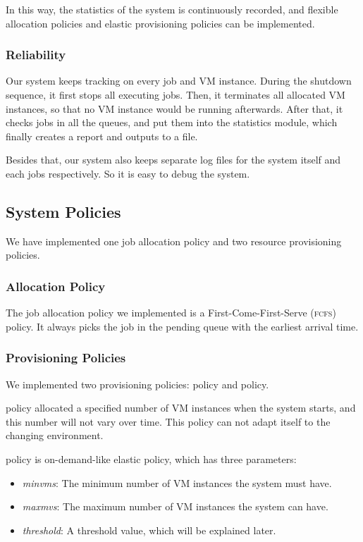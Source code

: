 In this way, the statistics of the system is continuously recorded,
and flexible allocation policies and elastic provisioning policies can
be implemented.


\subsubsection{Reliability}
Our system keeps tracking on every job and VM instance. During the
shutdown sequence, it first stops all executing jobs. Then, it
terminates all allocated VM instances, so that no VM instance would be
running afterwards. After that, it checks jobs in all the queues, and
put them into the statistics module, which finally creates a report
and outputs to a file.

Besides that, our system also keeps separate log files for the system
itself and each jobs respectively. So it is easy to debug the system.


\subsection{System Policies}
We have implemented one job allocation policy and two resource
provisioning policies.

\subsubsection{Allocation Policy}
The job allocation policy we implemented is a First-Come-First-Serve
(\textsc{fcfs}) policy. It always picks the job in the pending queue
with the earliest arrival time.

\subsubsection{Provisioning Policies}
We implemented two provisioning policies: \policystatic policy and
\policysimpleelastic policy.

\policystatic policy allocated a specified number of VM instances when the
system starts, and this number will not vary over time. This policy
can not adapt itself to the changing environment.

\policysimpleelastic policy is on-demand-like elastic policy, which has
three parameters:

\begin{itemize}
\item \emph{minvms}: The minimum number of VM instances the system
  must have.
\item \emph{maxmvs}: The maximum number of VM instances the system can
  have.
\item \emph{threshold}: A threshold value, which will be explained
  later.
\end{itemize}

